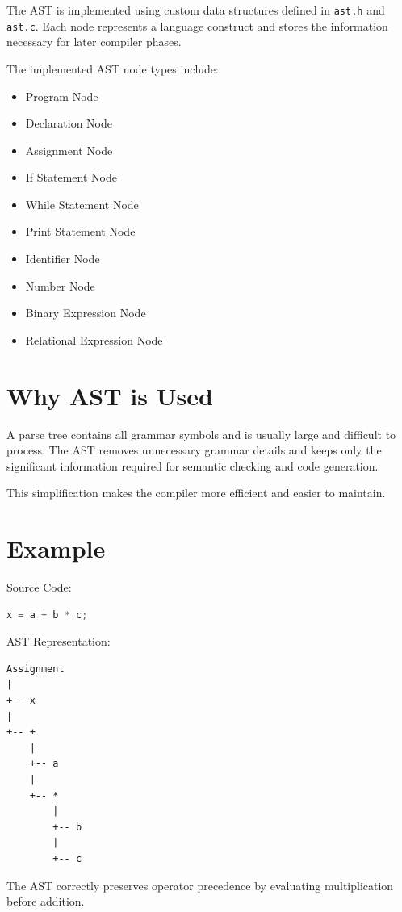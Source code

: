 \documentclass[12pt,a4paper]{report}
\begin{document}
The AST is implemented using custom data structures defined in \texttt{ast.h} and \texttt{ast.c}. Each node represents a language construct and stores the information necessary for later compiler phases.

The implemented AST node types include:

\begin{itemize}
    \item Program Node
    \item Declaration Node
    \item Assignment Node
    \item If Statement Node
    \item While Statement Node
    \item Print Statement Node
    \item Identifier Node
    \item Number Node
    \item Binary Expression Node
    \item Relational Expression Node
\end{itemize}

\section{Why AST is Used}

A parse tree contains all grammar symbols and is usually large and difficult to process. The AST removes unnecessary grammar details and keeps only the significant information required for semantic checking and code generation.

This simplification makes the compiler more efficient and easier to maintain.

\section{Example}

Source Code:

\begin{lstlisting}[language=C]
x = a + b * c;
\end{lstlisting}

AST Representation:

\begin{lstlisting}
Assignment
|
+-- x
|
+-- +
    |
    +-- a
    |
    +-- *
        |
        +-- b
        |
        +-- c
\end{lstlisting}

The AST correctly preserves operator precedence by evaluating multiplication before addition.
\end{document}
